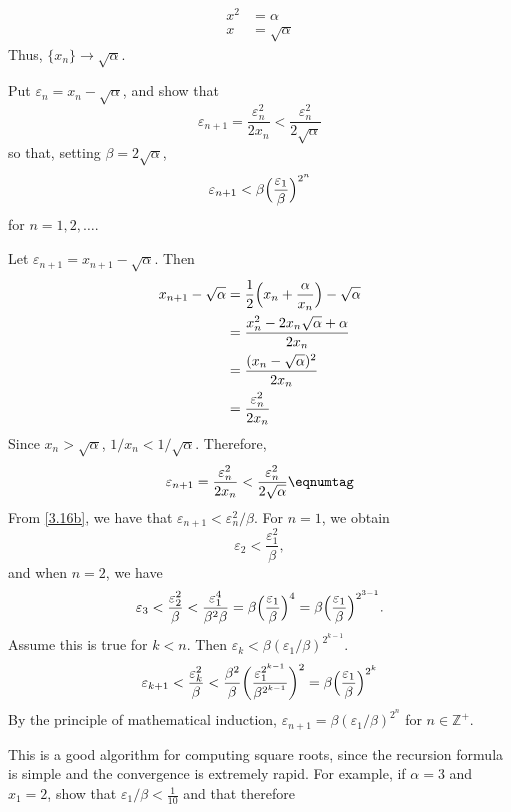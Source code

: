 \begin{exercise}
\begin{exercise}[label = (\alph*)]
\begin{align*}
      x^2 & = \alpha\\
      x & = \sqrt{\alpha}
    \end{align*}
    Thus, \(\{x_n\}\to\sqrt{\alpha}\).
  \item
    Put \(\varepsilon_n = x_n - \sqrt{\alpha}\), and show that
    \[
    \varepsilon_{n + 1} = \frac{\varepsilon_n^2}{2x_n} <
    \frac{\varepsilon_n^2}{2\sqrt{\alpha}}
    \]
    so that, setting \(\beta = 2\sqrt{\alpha}\),
    \[
    \varepsilon_{n + 1} < \beta\Bigl(\frac{\varepsilon_1}{\beta}\Bigr)^{2^n}
    \]
    for \(n = 1,2,\ldots\).
    \par\smallskip
    Let \(\varepsilon_{n + 1} = x_{n + 1} - \sqrt{\alpha}\).
    Then
    \begin{align*}
      x_{n + 1} - \sqrt{\alpha}
      & = \frac{1}{2}\Bigl(x_n + \frac{\alpha}{x_n}\Bigr) - \sqrt{\alpha}\\
      & = \frac{x_n^2 - 2x_n\sqrt{\alpha} + \alpha}{2x_n}\\
      & = \frac{(x_n - \sqrt{\alpha})^2}{2x_n}\\
      & = \frac{\varepsilon_n^2}{2x_n}
    \end{align*}
    Since \(x_n > \sqrt{\alpha}\), \(1/x_n < 1/\sqrt{\alpha}\).
    Therefore,
    \[
    \varepsilon_{n + 1} = \frac{\varepsilon_n^2}{2x_n} <
    \frac{\varepsilon_n^2}{2\sqrt{\alpha}}\eqnumtag\label{3.16b}
    \]
    From \cref{3.16b}, we have that \(\varepsilon_{n + 1} < \varepsilon_n^2/\beta\).
    For \(n = 1\), we obtain
    \[
    \varepsilon_2 < \frac{\varepsilon_1^2}{\beta},
    \]
    and when \(n = 2\), we have
    \[
    \varepsilon_3 < \frac{\varepsilon_2^2}{\beta} <
    \frac{\varepsilon_1^4}{\beta^2\beta} =
    \beta\Bigl(\frac{\varepsilon_1}{\beta}\Bigr)^4 =
    \beta\Bigl(\frac{\varepsilon_1}{\beta}\Bigr)^{2^{3 - 1}}.
    \]
    Assume this is true for \(k < n\).
    Then \(\varepsilon_k < \beta(\varepsilon_1/\beta)^{2^{k - 1}}\).
    \[
    \varepsilon_{k + 1} < \frac{\varepsilon_k^2}{\beta} < \frac{\beta^2}{\beta}
    \biggl(\frac{\varepsilon_1^{2^{k - 1}}}{\beta^{2^{k - 1}}}\biggr)^2 =
    \beta\Bigl(\frac{\varepsilon_1}{\beta}\Bigr)^{2^k}
    \]
    By the principle of mathematical induction,
    \(\varepsilon_{n + 1} = \beta(\varepsilon_1/\beta)^{2^n}\) for
    \(n\in\mathbb{Z}^+\).
  \item
    This is a good algorithm for computing square roots, since the recursion
    formula is simple and the convergence is extremely rapid.
    For example, if \(\alpha = 3\) and \(x_1 = 2\), show that
    \(\varepsilon_1/\beta < \frac{1}{10}\) and that therefore

\end{exercise}
\end{exercise}
